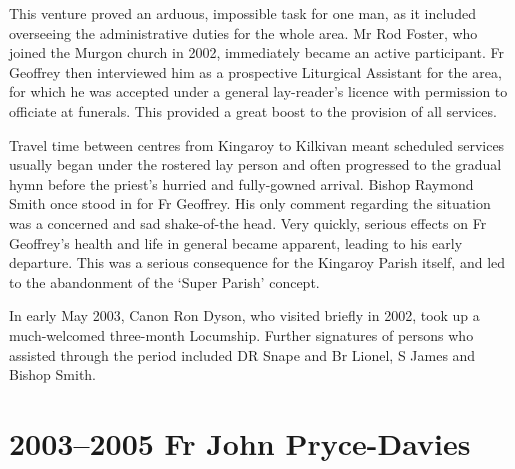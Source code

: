 This venture proved an arduous, impossible task for one man, as it included overseeing the administrative duties for the whole area. Mr Rod Foster, who joined the Murgon church in 2002, immediately became an active participant. Fr Geoffrey then interviewed him as a prospective Liturgical Assistant for the area, for which he was accepted under a general lay-reader's licence with permission to officiate at funerals. This provided a great boost to the provision of all services.



Travel time between centres from Kingaroy to Kilkivan meant scheduled services usually began under the rostered lay person and often progressed to the gradual hymn before the priest's hurried and fully-gowned arrival. Bishop Raymond Smith once stood in for Fr Geoffrey. His only comment regarding the situation was a concerned and sad shake-of-the head. Very quickly, serious effects on Fr Geoffrey's health and life in general became apparent, leading to his early departure. This was a serious consequence for the Kingaroy Parish itself, and led to the abandonment of the `Super Parish' concept.



In early May 2003, Canon Ron Dyson, who visited briefly in 2002, took up a much-welcomed three-month Locumship. Further signatures of persons who assisted through the period included DR Snape and Br Lionel, S James and Bishop Smith.



\section{2003--2005 Fr John Pryce-Davies}









